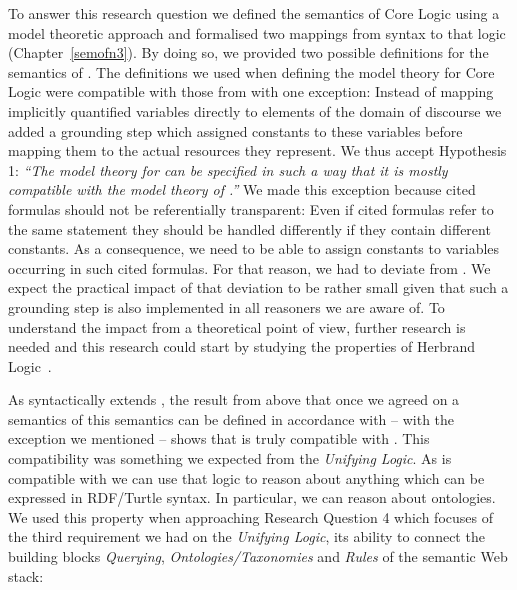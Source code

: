 To answer this research question we defined the semantics of  \nthree Core Logic using a model theoretic approach  and formalised two mappings 
from \nthree syntax to that logic (Chapter~\ref{semofn3}). By doing so, we provided two possible definitions for the semantics of \nthree.
The definitions we used when defining the model theory for \nthree Core Logic were compatible with those from \rdf with one exception:
Instead of mapping implicitly quantified variables directly to elements of the domain of discourse we added a grounding step which assigned 
\nthree constants to these variables before mapping them to the actual resources they represent.
We thus accept Hypothesis 1: \emph{``The model theory for \nthreelogic can be specified in such a way that it is mostly compatible with the model theory of \rdf.''}
We made this exception because
cited  \nthree formulas should not be referentially transparent: Even if cited formulas refer to the same statement they should be
handled differently if they contain different constants. As a consequence, we need to be able to assign constants to variables occurring in such cited formulas.
For that reason, we had to deviate from \rdf. We expect the practical impact of that deviation to be rather small given that such a grounding step is also implemented in all 
\nthree reasoners we are aware of. To understand the impact from a theoretical point of view, further research is needed and this research could start by studying the properties of 
Herbrand Logic~\cite{herbrandLogic}.
% 

As \nthree syntactically extends \rdf, the result from above that once we agreed on a semantics of \nthree this semantics can be defined in accordance 
with \rdf{} -- with the exception we mentioned -- shows that \nthree is truly compatible with \rdf. This compatibility was something we expected from the \emph{Unifying Logic}.
As \nthree is compatible with \rdf we can use that logic to reason about anything which can be expressed in RDF/Turtle syntax. In particular, we can reason about \owl ontologies. 
We used this property when approaching Research Question 4 which focuses of the third requirement we had on the \emph{Unifying Logic}, its ability to connect the building 
blocks \emph{Querying}, \emph{Ontologies/Taxonomies} and \emph{Rules} of the semantic Web stack:


